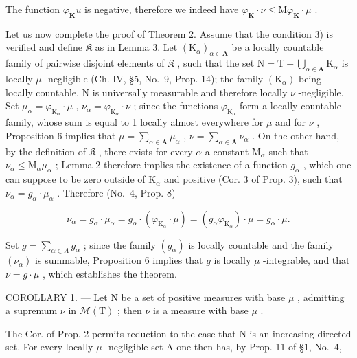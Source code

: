 The function \(\varphi_{\mathbf{K}}u\) is negative, therefore we indeed have \(\varphi_{\mathbf{K}}\cdot \nu \leqslant \mathrm{M}\varphi_{\mathbf{K}}\cdot \mu\) .

Let us now complete the proof of Theorem 2. Assume that the condition 3) is verified and define \(\mathfrak{K}\) as in Lemma 3. Let \((\mathrm{K}_{\alpha})_{\alpha \in \mathbf{A}}\) be a locally countable family of pairwise disjoint elements of \(\mathfrak{K}\) , such that the set \(\mathrm{N} = \mathrm{T} - \bigcup_{\alpha \in \mathbf{A}} \mathrm{K}_{\alpha}\) is locally \(\mu\) -negligible (Ch. IV, §5, No.~9, Prop. 14); the family \((\mathrm{K}_{\alpha})\) being locally countable, N is universally measurable and therefore locally \(\nu\) -negligible. Set \(\mu_{\alpha} = \varphi_{\mathrm{K}_{\alpha}} \cdot \mu\) , \(\nu_{\alpha} = \varphi_{\mathrm{K}_{\alpha}} \cdot \nu\) ; since the functions \(\varphi_{\mathrm{K}_{\alpha}}\) form a locally countable family, whose sum is equal to 1 locally almost everywhere for \(\mu\) and for \(\nu\) , Proposition 6 implies that \(\mu = \sum_{\alpha \in \mathbf{A}} \mu_{\alpha}\) , \(\nu = \sum_{\alpha \in \mathbf{A}} \nu_{\alpha}\) . On the other hand, by the definition of \(\mathfrak{K}\) , there exists for every \(\alpha\) a constant \(\mathrm{M}_{\alpha}\) such that \(\nu_{\alpha} \leqslant \mathrm{M}_{\alpha} \mu_{\alpha}\) ; Lemma 2 therefore implies the existence of a function \(g_{\alpha}\) , which one can suppose to be zero outside of \(\mathrm{K}_{\alpha}\) and positive (Cor. 3 of Prop. 3), such that \(\nu_{\alpha} = g_{\alpha} \cdot \mu_{\alpha}\) . Therefore (No.~4, Prop. 8)

\[
\nu_ {\alpha} = g _ {\alpha} \cdot \mu_ {\alpha} = g _ {\alpha} \cdot (\varphi_ {\mathrm{K} _ {\alpha}} \cdot \mu) = (g _ {\alpha} \varphi_ {\mathrm{K} _ {\alpha}}) \cdot \mu = g _ {\alpha} \cdot \mu .
\]

Set \(g = \sum_{\alpha \in A} g_{\alpha}\) ; since the family \((g_{\alpha})\) is locally countable and the family \((\nu_{\alpha})\) is summable, Proposition 6 implies that \(g\) is locally \(\mu\) -integrable, and that \(\nu = g \cdot \mu\) , which establishes the theorem.

COROLLARY 1. --- Let N be a set of positive measures with base \(\mu\) , admitting a supremum \(\nu\) in \(\mathcal{M}(\mathrm{T})\) ; then \(\nu\) is a measure with base \(\mu\) .

The Cor. of Prop. 2 permits reduction to the case that N is an increasing directed set. For every locally \(\mu\) -negligible set A one then has, by Prop. 11 of §1, No.~4,

